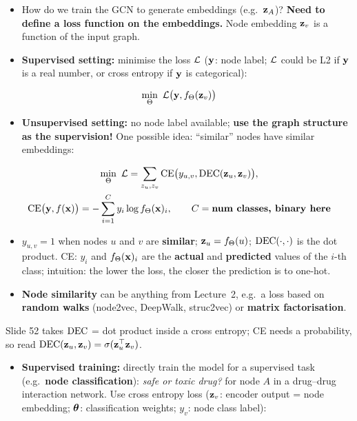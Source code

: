\begin{itemize}
  \item How do we train the GCN to generate embeddings (e.g.\ $\mathbf{z}_A$)?
    \textbf{Need to define a loss function on the embeddings.} Node embedding
    $\mathbf{z}_v$ is a function of the input graph.
  \item \textbf{Supervised setting:} minimise the loss $\mathcal{L}$ ($\mathbf{y}$: node
    label; $\mathcal{L}$ could be L2 if $\mathbf{y}$ is a real number, or cross entropy if
    $\mathbf{y}$ is categorical):
\end{itemize}
\begin{equation}\label{eq:lec03-supervised}
  \min_\Theta\ \mathcal{L}\bigl(\mathbf{y}, f_\Theta(\mathbf{z}_v)\bigr)
\end{equation}
\begin{itemize}
  \item \textbf{Unsupervised setting:} no node label available; \textbf{use the
    graph structure as the supervision!} One possible idea: ``similar'' nodes
    have similar embeddings:
\end{itemize}
\begin{gather}
  \min_\Theta\ \mathcal{L} = \sum_{z_u,z_v}\mathrm{CE}\bigl(y_{u,v},\operatorname{DEC}(\mathbf{z}_u,\mathbf{z}_v)\bigr),
  \label{eq:lec03-unsupervised}\\
  \mathrm{CE}\bigl(\mathbf{y},f(\mathbf{x})\bigr) = -\sum_{i=1}^{C} y_i\log f_\Theta(\mathbf{x})_i, \qquad C = \textbf{num classes, binary here} \label{eq:lec03-ce-unsup}
\end{gather}
\begin{itemize}
  \item $y_{u,v}=1$ when nodes $u$ and $v$ are \textbf{similar};
    $\mathbf{z}_u=f_\Theta(u)$; $\operatorname{DEC}(\cdot,\cdot)$ is the dot product. CE: $y_i$ and
    $f_\Theta(\mathbf{x})_i$ are the \textbf{actual} and \textbf{predicted} values of
    the $i$-th class; intuition: the lower the loss, the closer the prediction
    is to one-hot.
  \item \textbf{Node similarity} can be anything from Lecture~2, e.g.\ a loss
    based on \textbf{random walks} (node2vec, DeepWalk, struc2vec) or
    \textbf{matrix factorisation}.
\end{itemize}
\begin{caution}
  Slide 52 takes $\operatorname{DEC}$ = dot product inside a cross entropy; CE needs a
  probability, so read $\operatorname{DEC}(\mathbf{z}_u,\mathbf{z}_v)=\sigma(\mathbf{z}_u^{\top}\mathbf{z}_v)$.
\end{caution}
\begin{itemize}
  \item \textbf{Supervised training:} directly train the model for a supervised
    task (e.g.\ \textbf{node classification}): \emph{safe or toxic drug?} for
    node $A$ in a drug--drug interaction network. Use cross entropy loss
    ($\mathbf{z}_v$: encoder output = node embedding; $\bm{\theta}$: classification
    weights; $y_v$: node class label):
\end{itemize}
